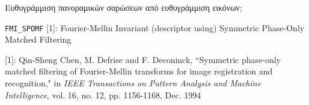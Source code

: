 \begin{frame}{Ευθυγράμμιση πανοραμικών σαρώσεων από ευθυγράμμιση εικόνων;}

  {\small
  \texttt{FMI\_SPOMF} [1]: Fourier-Mellin Invariant (descriptor using) Symmetric Phase-Only Matched Filtering
  }

  \begin{figure}
    
  \end{figure}

  \placebottom
  \tiny
  [1]: Qin-Sheng Chen, M. Defrise and F. Deconinck, ``Symmetric phase-only matched filtering of Fourier-Mellin transforms for image registration and recognition," in \textit{IEEE Transactions on Pattern Analysis and Machine Intelligence}, vol. 16, no. 12, pp. 1156-1168, Dec. 1994


\end{frame}
